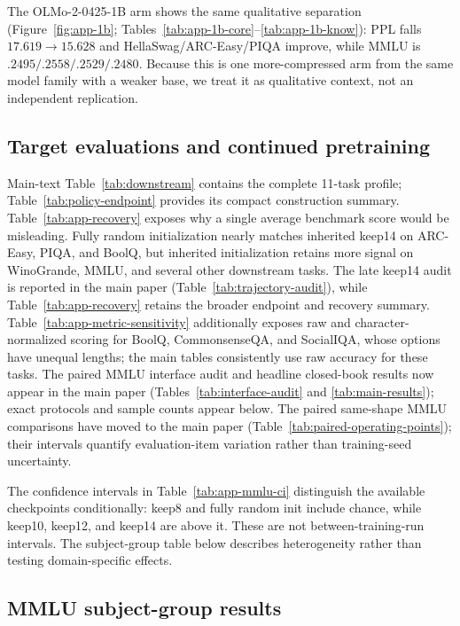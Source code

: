 The OLMo-2-0425-1B arm shows the same qualitative separation
(Figure~\ref{fig:app-1b}; Tables~\ref{tab:app-1b-core}--\ref{tab:app-1b-know}):
PPL falls $17.619\to15.628$ and HellaSwag/ARC-Easy/PIQA improve, while MMLU is
$.2495/.2558/.2529/.2480$. Because this is one more-compressed arm from the same
model family with a weaker base, we treat it as qualitative context, not an
independent replication.



\subsection{Target evaluations and continued pretraining}
\label{app:recovery}




Main-text Table~\ref{tab:downstream} contains the complete 11-task profile;
Table~\ref{tab:policy-endpoint} provides its compact construction summary.
Table~\ref{tab:app-recovery} exposes why a single average benchmark score would
be misleading. Fully random initialization nearly matches inherited keep14 on
ARC-Easy, PIQA, and BoolQ, but inherited initialization retains more signal on
WinoGrande, MMLU, and several other downstream tasks. The late keep14 audit is
reported in the main paper (Table~\ref{tab:trajectory-audit}), while
Table~\ref{tab:app-recovery} retains the broader endpoint and recovery summary.
Table~\ref{tab:app-metric-sensitivity} additionally exposes raw and
character-normalized scoring for BoolQ, CommonsenseQA, and SocialIQA,
whose options have unequal lengths; the main tables consistently use raw
accuracy for these tasks. The paired MMLU interface audit and headline
closed-book results now appear in the main paper
(Tables~\ref{tab:interface-audit} and \ref{tab:main-results}); exact protocols
and sample counts appear below.
The paired same-shape MMLU comparisons have moved to the main paper
(Table~\ref{tab:paired-operating-points}); their intervals quantify
evaluation-item variation rather than training-seed uncertainty.

The confidence intervals in Table~\ref{tab:app-mmlu-ci} distinguish the
available checkpoints conditionally: keep8 and fully random init include
chance, while keep10, keep12, and keep14 are above it. These are not
between-training-run intervals. The subject-group table below describes
heterogeneity rather than testing domain-specific effects.

\subsection{MMLU subject-group results}
\label{app:mmlu-subjects}

